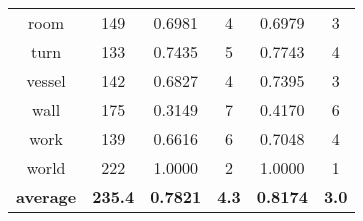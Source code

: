 \begin{table}
\begin{tabular}{c|c|c|c|c|c}
             room &             149 &              0.6981 &                         4 &             0.6979 &                        3 \\
             turn &             133 &              0.7435 &                         5 &             0.7743 &                        4 \\
           vessel &             142 &              0.6827 &                         4 &             0.7395 &                        3 \\
             wall &             175 &              0.3149 &                         7 &             0.4170 &                        6 \\
             work &             139 &              0.6616 &                         6 &             0.7048 &                        4 \\
            world &             222 &              1.0000 &                         2 &             1.0000 &                        1 \\
 \textbf{average} &  \textbf{235.4} &     \textbf{0.7821} &              \textbf{4.3} &    \textbf{0.8174} &             \textbf{3.0} \\
\bottomrule
\end{tabular}
\end{table}
